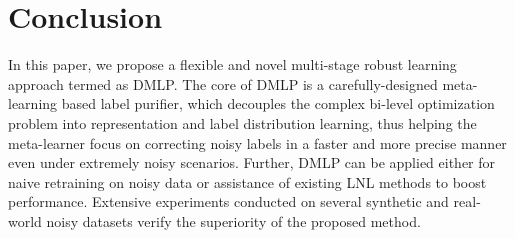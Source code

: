 \documentclass[10pt,twocolumn,letterpaper]{article}
\begin{document}
\begin{table}[]
\begin{minipage}{1.0\linewidth}
\vspace{1em}
    \caption{
       {Comparison between recent} semi-supervised methods {and DMLP-DivideMix} on CIFAR-10/100 with $100\%$ noisy ratio.} 
    \vspace{-1em}
    \centering 
    \vspace{-3mm}
    \label{tab:ablation_semi} 
\end{minipage}
\end{table}





\section{Conclusion}
In this paper, we propose a flexible and novel multi-stage robust learning approach {termed as} DMLP. The core of DMLP is a carefully-designed meta-learning based label purifier, which decouples {the complex bi-level optimization problem into} representation and label distribution learning, {thus helping} the meta-learner focus on correcting noisy labels in a faster and more precise manner even under extremely noisy scenarios. Further, DMLP can be applied either for naive retraining on noisy data or assistance of existing LNL methods to boost performance.
Extensive experiments conducted on several synthetic and real-world noisy datasets verify the superiority of the proposed method.





{\small


}
\end{document}
